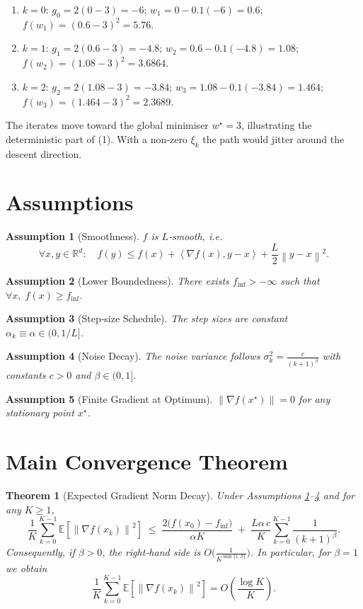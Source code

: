 \documentclass[11pt]{article}
\newtheorem{theorem}{Theorem}
\newtheorem{assumption}{Assumption}
\newcommand{\EE}{\mathbb{E}}
\newcommand{\RR}{\mathbb{R}}
\newcommand{\norm}[1]{\left\lVert#1\right\rVert}
\newcommand{\inner}[2]{\left\langle #1,#2\right\rangle}
\begin{document}
\begin{enumerate}
\item $k=0$: $g_{0}=2(0-3)=-6$; $w_{1}=0-0.1(-6)=0.6$; $f(w_{1})=(0.6-3)^{2}=5.76$.
\item $k=1$: $g_{1}=2(0.6-3)=-4.8$; $w_{2}=0.6-0.1(-4.8)=1.08$; $f(w_{2})=(1.08-3)^{2}=3.6864$.
\item $k=2$: $g_{2}=2(1.08-3)=-3.84$; $w_{3}=1.08-0.1(-3.84)=1.464$; $f(w_{3})=(1.464-3)^{2}=2.3689$.
\end{enumerate}
The iterates move toward the global minimiser $w^{\star}=3$, illustrating the deterministic part of (1). With a non‑zero $\xi_{k}$ the path would jitter around the descent direction.

\newpage
\section*{Assumptions}
\begin{assumption}[Smoothness]\label{as:smooth}
$f$ is $L$‑smooth, i.e.
\[
\forall x,y\in\RR^{d}:\quad 
f(y)\le f(x)+\inner{\nabla f(x)}{y-x}+\frac{L}{2}\norm{y-x}^{2}.
\tag{A1}
\]
\end{assumption}
\begin{assumption}[Lower Boundedness]\label{as:lb}
There exists $f_{\inf}>-\infty$ such that $\forall x,\;f(x)\ge f_{\inf}$.
\end{assumption}
\begin{assumption}[Step‑size Schedule]\label{as:stepsize}
The step sizes are constant $\alpha_{k}\equiv\alpha\in(0,1/L]$.
\end{assumption}
\begin{assumption}[Noise Decay]\label{as:noise}
The noise variance follows $\sigma_{k}^{2}=\frac{c}{(k+1)^{\beta}}$ with constants $c>0$ and $\beta\in(0,1]$.
\end{assumption}
\begin{assumption}[Finite Gradient at Optimum]\label{as:gradopt}
$\norm{\nabla f(x^{\star})}=0$ for any stationary point $x^{\star}$.
\end{assumption}

\section*{Main Convergence Theorem}
\begin{theorem}[Expected Gradient Norm Decay]\label{thm:main}
Under Assumptions \ref{as:smooth}–\ref{as:noise} and for any $K\ge1$,
\[
\frac{1}{K}\sum_{k=0}^{K-1}\EE\!\left[\norm{\nabla f(x_{k})}^{2}\right]
\;\le\;
\frac{2\bigl(f(x_{0})-f_{\inf}\bigr)}{\alpha K}
\;+\;
\frac{L\alpha\,c}{K}\sum_{k=0}^{K-1}\frac{1}{(k+1)^{\beta}}.
\tag{2}
\]
Consequently, if $\beta>0$, the right‑hand side is $O\!\bigl(\tfrac{1}{K^{\min\{1,\beta\}}}\bigr)$. In particular, for $\beta=1$ we obtain
\[
\frac{1}{K}\sum_{k=0}^{K-1}\EE\!\left[\norm{\nabla f(x_{k})}^{2}\right]
=O\!\left(\frac{\log K}{K}\right).
\]
\end{theorem}
\end{document}
